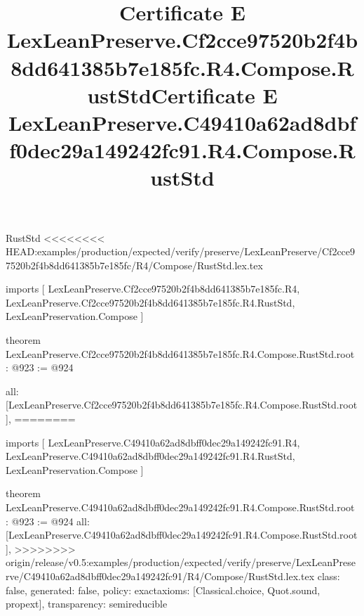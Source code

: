\begin{lexlean}{RustStd}
<<<<<<<< HEAD:examples/production/expected/verify/preserve/LexLeanPreserve/Cf2cce97520b2f4b8dd641385b7e185fc/R4/Compose/RustStd.lex.tex
\title{Certificate E LexLeanPreserve.Cf2cce97520b2f4b8dd641385b7e185fc.R4.Compose.RustStd}
\begin{coremodule}
imports [
  LexLeanPreserve.Cf2cce97520b2f4b8dd641385b7e185fc.R4,
  LexLeanPreserve.Cf2cce97520b2f4b8dd641385b7e185fc.R4.RustStd,
  LexLeanPreservation.Compose
]

theorem LexLeanPreserve.Cf2cce97520b2f4b8dd641385b7e185fc.R4.Compose.RustStd.root : @923 := @924 {
  all: [LexLeanPreserve.Cf2cce97520b2f4b8dd641385b7e185fc.R4.Compose.RustStd.root],
========
\title{Certificate E LexLeanPreserve.C49410a62ad8dbff0dec29a149242fc91.R4.Compose.RustStd}
\begin{coremodule}
imports [
  LexLeanPreserve.C49410a62ad8dbff0dec29a149242fc91.R4,
  LexLeanPreserve.C49410a62ad8dbff0dec29a149242fc91.R4.RustStd,
  LexLeanPreservation.Compose
]

theorem LexLeanPreserve.C49410a62ad8dbff0dec29a149242fc91.R4.Compose.RustStd.root : @923 := @924 {
  all: [LexLeanPreserve.C49410a62ad8dbff0dec29a149242fc91.R4.Compose.RustStd.root],
>>>>>>>> origin/release/v0.5:examples/production/expected/verify/preserve/LexLeanPreserve/C49410a62ad8dbff0dec29a149242fc91/R4/Compose/RustStd.lex.tex
  class: false,
  generated: false,
  policy: exact{axioms: [Classical.choice, Quot.sound, propext]},
  transparency: semireducible
}


\end{coremodule}}
\end{coremodule}
\end{lexlean}
